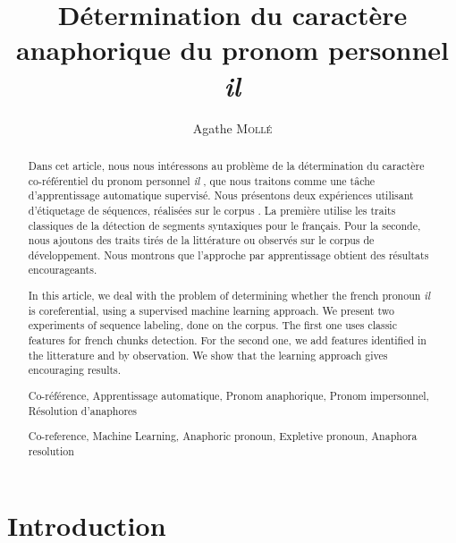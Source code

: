 \documentclass[a4paper,12pt]{article}
\title{Détermination du caractère anaphorique du pronom personnel \og{}\textit{il}\fg{}}
\author{Agathe \textsc{Mollé}}
\begin{document}
\maketitle

\begin{abstract}
Dans cet article, nous nous intéressons au problème de la détermination du caractère co-référentiel du pronom personnel \og \textit{il} \fg{}, que nous traitons comme une tâche d'apprentissage automatique supervisé. Nous présentons deux expériences utilisant d'étiquetage de séquences, réalisées sur le corpus \citet{tutin-hal-00373327}. La première utilise les traits classiques de la détection de segments syntaxiques pour le français. Pour la seconde, nous ajoutons des traits tirés de la littérature ou observés sur le corpus de développement. Nous montrons que l'approche par apprentissage obtient des résultats encourageants.
\end{abstract}


\renewcommand\abstractname{Abstract}
\begin{abstract}
In this article, we deal with the problem of determining whether the french pronoun \og \textit{il} \fg{} is coreferential, using a supervised machine learning approach. We present two experiments of sequence labeling, done on the \citet{tutin-hal-00373327} corpus. The first one uses classic features for french chunks detection. For the second one, we add features identified in the litterature and by observation. We show that the learning approach gives encouraging results.
\end{abstract}


\paragraph{}

\renewcommand\abstractname{Mots-clés}
\begin{abstract}
Co-référence, Apprentissage automatique, Pronom anaphorique, Pronom impersonnel, Résolution d'anaphores
\end{abstract}

\renewcommand\abstractname{Keywords}
\begin{abstract}
Co-reference, Machine Learning, Anaphoric pronoun, Expletive pronoun, Anaphora resolution
\end{abstract}

\section*{Introduction}
\end{document}
